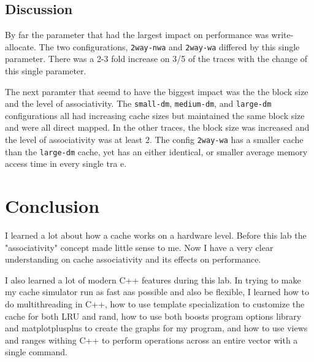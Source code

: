 \documentclass[12pt]{article}
\begin{document}
\subsection{Discussion}
By far the parameter that had the largest impact on performance was write-allocate. The two configurations, \verb|2way-nwa| and \verb|2way-wa| differed by this single parameter. There was a 2-3 fold increase on 3/5 of the traces with the change of this single parameter.

The next paramter that seemd to have the biggest impact was the the block size and the level of associativity. The \verb|small-dm|, \verb|medium-dm|, and \verb|large-dm| configurations all had increasing cache sizes but maintained the same block size and were all direct mapped. In the other traces, the block size was increased and the level of associativity was at least 2. The config \verb|2way-wa| has a smaller cache than the \verb|large-dm| cache, yet has an either identical, or smaller average memory access time in every single tra
e.
\section{Conclusion}
I learned a lot about how a cache works on a hardware level. Before this lab the "associativity" concept made little sense to me. Now I have a very clear understanding on cache associativity and its effects on performance. 

I also learned a lot of modern C++ features during this lab. In trying to make my cache simulator run as fast aas possible and also be flexible, I learned how to do multithreading in C++, how to use template specialization to customize the cache for both LRU and rand, how to use both boosts program options library and matplotplusplus to create the graphs for my program, and how to use views and ranges withing C++ to perform operations across an entire vector with a single command.
\end{document}

